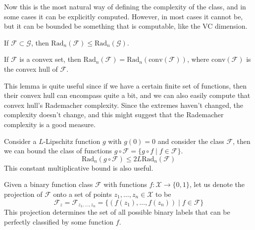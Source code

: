 \documentclass{article}
\begin{document}
  Now this is the most natural way of defining the complexity of the class, and in some cases it can be explicitly computed. However, in most cases it cannot be, but it can be bounded be something that is computable, like the VC dimension. 

  \begin{lemma}
    If $\mathcal{F} \subset \mathcal{G}$, then $\mathrm{Rad}_n (\mathcal{F}) \leq \mathrm{Rad}_n (\mathcal{G})$.
  \end{lemma}

  \begin{lemma}
    If $\mathcal{F}$ is a convex set, then $\mathrm{Rad}_n (\mathcal{F}) = \mathrm{Rad}_n (\mathrm{conv}(\mathcal{F}))$, where $\mathrm{conv}(\mathcal{F})$ is the convex hull of $\mathcal{F}$.
  \end{lemma}

  This lemma is quite useful since if we have a certain finite set of functions, then their convex hull can encompass quite a bit, and we can also easily compute that convex hull's Rademacher complexity. Since the extremes haven't changed, the complexity doesn't change, and this might suggest that the Rademacher complexity is a good measure. 

  \begin{lemma}
    Consider a $L$-Lipschitz function $g$  with $g(0) = 0$ and consider the class $\mathcal{F}$, then we can bound the class of functions $g \circ \mathcal{F} = \{ g \circ f \mid f \in \mathcal{F} \}$. 
    \begin{equation}
      \mathrm{Rad}_n (g \circ \mathcal{F}) \leq 2 L \mathrm{Rad}_n (\mathcal{F})
    \end{equation}
    This constant multiplicative bound is also useful. 
  \end{lemma}

  \begin{definition}
    Given a binary function class $\mathcal{F}$ with functions $f: \mathcal{X} \rightarrow \{0, 1\}$, let us denote the projection of $\mathcal{F}$ onto a set of points $z_1, \ldots, z_n \in \mathcal{X}$ to be 
    \begin{equation}
      \mathcal{F}_z = \mathcal{F}_{z_1, \ldots, z_n} = \{ (f(z_1), \ldots, f(z_n)) \mid f \in \mathcal{F} \}
    \end{equation}
    This projection determines the set of all possible binary labels that can be perfectly classified by some function $f$. 
  \end{definition}
\end{document}
